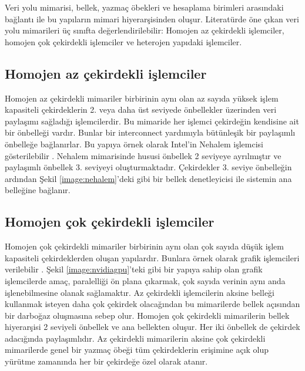 Veri yolu mimarisi, bellek, yazmaç öbekleri ve hesaplama birimleri arasındaki bağlantı ile bu yapıların mimari hiyerarşisinden oluşur. Literatürde öne çıkan veri yolu mimarileri üç sınıfta değerlendirilebilir: Homojen az çekirdekli işlemciler, homojen çok çekirdekli işlemciler ve heterojen yapıdaki işlemciler. \par

\subsection{Homojen az çekirdekli işlemciler}
Homojen az çekirdekli mimariler birbirinin aynı olan az sayıda yüksek işlem kapasiteli çekirdeklerin 2. veya daha üst seviyede önbellekler üzerinden veri paylaşımı sağladığı işlemcilerdir. Bu mimaride her işlemci çekirdeğin kendisine ait bir önbelleği vardır. Bunlar bir interconnect yardımıyla bütünleşik bir paylaşımlı önbelleğe bağlanırlar. Bu yapıya örnek olarak Intel'in Nehalem işlemcisi gösterilebilir \cite{molka2009memory} \cite{hackenberg2009comparing}. Nehalem mimarisinde hususi önbellek 2 seviyeye ayrılmıştır ve paylaşımlı önbellek 3. seviyeyi oluşturmaktadır. Çekirdekler 3. seviye önbelleğin ardından Şekil \ref{image:nehalem}'deki gibi bir bellek denetleyicisi ile sistemin ana belleğine bağlanır.\par


\subsection{Homojen çok çekirdekli işlemciler}
Homojen çok çekirdekli mimariler birbirinin aynı olan çok sayıda düşük işlem kapasiteli çekirdeklerden oluşan yapılardır. Bunlara örnek olarak grafik işlemcileri verilebilir \cite{MCSE.2012.23}. Şekil \ref{image:nvidiagpu}'teki gibi bir yapıya sahip olan grafik işlemcilerde amaç, paralelliği ön plana çıkarmak, çok sayıda verinin aynı anda işlenebilmesine olanak sağlamaktır. Az çekirdekli işlemcilerin aksine belleği kullanmak isteyen daha çok çekirdek olacağından bu mimarilerde bellek açısından bir darboğaz oluşmasına sebep olur. Homojen çok çekirdekli mimarilerin bellek hiyerarşisi 2 seviyeli önbellek ve ana bellekten oluşur. Her iki önbellek de çekirdek adacığında paylaşımlıdır. Az çekirdekli mimarilerin aksine çok çekirdekli mimarilerde genel bir yazmaç öbeği tüm çekirdeklerin erişimine açık olup yürütme zamanında her bir çekirdeğe özel olarak atanır.


